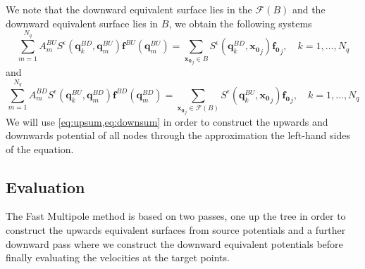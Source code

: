 We note that the downward equivalent surface lies in the $\mathcal{F}(B)$ and the downward equivalent surface lies in $B$, we obtain the following systems
\begin{equation}
\label{eq:upsum}
    \sum_{m=1}^{N_{q}} A_{m}^{BU} S^\epsilon\left(\mathbf{q}^{BD}_{k}, \mathbf{q}_{m}^{B U}\right) \mathbf{f}^{B U}\left(\mathbf{q}_{m}^{B U}\right)=\sum_{\mathbf{x_0}_{j} \in B} S^\epsilon\left(\mathbf{q}^{BD}_{k}, \mathbf{x_0}_{j}\right) \mathbf{f_0}_{j}, \quad k=1,\dots,N_q
\end{equation}
and
\begin{equation}
\label{eq:downsum}
    \sum_{m=1}^{N_{q}} A_{m}^{BD} S^\epsilon\left(\mathbf{q}^{BU}_{k}, \mathbf{q}_{m}^{B D}\right) \mathbf{f}^{B D}\left(\mathbf{q}_{m}^{B D}\right)=\sum_{\mathbf{x_0}_{j} \in \mathcal{F}(B)} S^\epsilon\left(\mathbf{q}^{BU}_{k}, \mathbf{x_0}_{j}\right) \mathbf{f_0}_{j}, \quad k=1,\dots,N_q
\end{equation}
We will use \cref{eq:upsum,eq:downsum} in order to construct the upwards and downwards potential of all nodes through the approximation the left-hand sides of the equation. 

\subsection{Evaluation}
The Fast Multipole method is based on two passes, one up the tree in order to construct the upwards equivalent surfaces from source potentials and a further downward pass where we construct the downward equivalent potentials before finally evaluating the velocities at the target points. 

